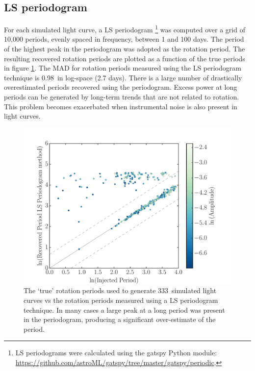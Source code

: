 \documentclass[useAMS, usenatbib, preprint, 12pt]{aastex}
\newcommand{\naigrain}{333}
\newcommand{\pgramRMS}{0.98}
\begin{document}
\subsection{LS periodogram}

For each simulated light curve, a LS periodogram
\footnote{LS periodograms were calculated using the gatspy Python module:
\url{https://github.com/astroML/gatspy/tree/master/gatspy/periodic}.}
was computed over a grid of 10,000 periods, evenly spaced in frequency,
between 1 and 100 days.
The period of the highest peak in the periodogram was adopted as the rotation
period.
The resulting recovered rotation periods are plotted as a function of the true
periods in figure \ref{fig:pgram_compare}.
The MAD for rotation periods measured using the LS periodogram technique is
\pgramRMS\ in log-space (2.7 days).
There is a large number of drastically overestimated periods recovered using
the periodogram.
Excess power at long periods can be generated by long-term trends that are not
related to rotation.
This problem becomes exacerbated when instrumental noise is also present in
light curves.

\begin{figure}
\begin{center}
\includegraphics[width=6in, clip=true]{figures/compare_pgram.pdf}
\caption[LS periodogram results.]
{The `true' rotation periods used to generate \naigrain\ simulated light
curves vs the rotation periods measured using a LS periodogram technique.
In many cases a large peak at a long period was present in the periodogram,
    producing a significant over-estimate of the period.
    }
\label{fig:pgram_compare}
\end{center}
\end{figure}
\end{document}
